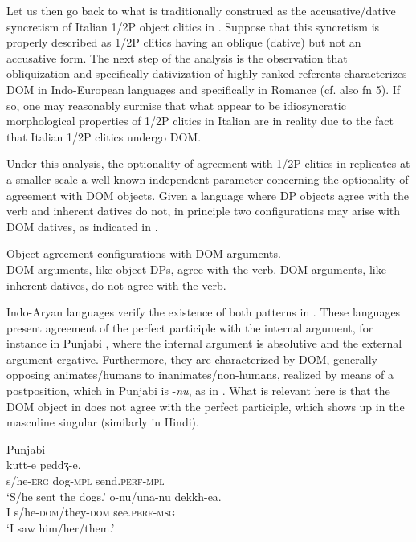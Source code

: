 \documentclass[output=paper,colorlinks,citecolor=brown,nonflat]{./langscibook}
\begin{document}
Let us then go back to what is traditionally construed as the accusative/dative syncretism of Italian 1/2P object clitics in .  Suppose that this syncretism is properly described as 1/2P clitics having an oblique (dative) but not an accusative form. The next step of the analysis is the observation that obliquization and specifically dativization of highly ranked referents characterizes DOM in Indo-European languages and specifically in Romance (cf. also fn 5).  If so, one may reasonably surmise that what appear to be idiosyncratic morphological properties of 1/2P clitics in Italian are in reality due to the fact that Italian 1/2P clitics undergo DOM.

Under this analysis, the optionality of agreement with 1/2P clitics in  replicates at a smaller scale a well-known independent parameter concerning the optionality of agreement with DOM objects. Given a language where DP objects agree with the verb and inherent datives do not, in principle two configurations may arise with DOM datives, as indicated in .

\ea%
    \label{ex:manzini:17}
    Object agreement configurations with DOM arguments. \\
    \ea\label{ex:manzini:17a}
    DOM arguments, like object DPs, agree with the verb.
    \ex\label{ex:manzini:17b}
    DOM arguments, like inherent datives, do not agree with the verb.
    \z
\z

Indo-Aryan languages verify the existence of both patterns in . These languages present agreement of the perfect participle with the internal argument, for instance in Punjabi , where the internal argument is absolutive and the external argument ergative. Furthermore, they are characterized by DOM, generally opposing animates/humans to inanimates/non-humans, realized by means of a postposition, which in Punjabi is -\textit{nu}, as in . What is relevant here is that the DOM object in  does not agree with the perfect participle, which shows up in the masculine singular (similarly in Hindi).

\ea%
    \label{ex:manzini:18}
    Punjabi \citep{ManziniSavoiaFranco2015}\\
    \ea\label{ex:manzini:18a}
         {kutt-e}     {peddʒ-e}.\\
        s/he-\textsc{erg}   dog-\textsc{mpl}   send.\textsc{perf-mpl}\\
    \glt ‘S/he sent the dogs.’
    \ex\label{ex:manzini:18b}
       {o-nu/una-nu}       {dekkh-ea}.\\
        I   s/he\textsc{{}-dom}/they\textsc{{}-dom}    see.\textsc{perf-msg}\\
    \glt ‘I saw him/her/them.’
    \z
\z
\end{document}
